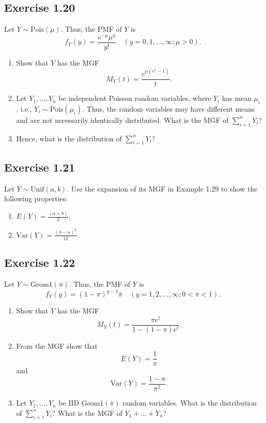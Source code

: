 \documentclass{book}
\begin{document}
\subsection{Exercise 1.20}
Let $Y \sim \text{Pois}(\mu)$. Thus, the PMF of $Y$ is
\[
f_Y(y) = \frac{e^{-\mu} \mu^y}{y!} \quad (y = 0, 1, \ldots, \infty; \mu > 0).
\]
\begin{enumerate}
    \item Show that $Y$ has the MGF
    \[
    M_Y(t) = \frac{e^{\mu(e^t - 1)}}{t}.
    \]
    \item Let $Y_1, \ldots, Y_n$ be independent Poisson random variables, where $Y_i$ has mean $\mu_i$, i.e., $Y_i \sim \text{Pois}(\mu_i)$. Thus, the random variables may have different means and are not necessarily identically distributed. What is the MGF of $\sum_{i=1}^n Y_i$? 
    \item Hence, what is the distribution of $\sum_{i=1}^n Y_i$?
\end{enumerate}

\subsection{Exercise 1.21}
Let $Y \sim \text{Unif}(a, b)$. Use the expansion of its MGF in Example 1.29 to show the following properties:
\begin{enumerate}
    \item $E(Y) = \frac{(a + b)}{2}$;
    \item $\text{Var}(Y) = \frac{(b - a)^2}{12}$.
\end{enumerate}

\subsection{Exercise 1.22}
Let $Y \sim \text{Geom1}(\pi)$. Thus, the PMF of $Y$ is
\[
f_Y(y) = (1 - \pi)^{y - 1} \pi \quad (y = 1, 2, \ldots, \infty; 0 < \pi < 1).
\]
\begin{enumerate}
    \item Show that $Y$ has the MGF
    \[
    M_Y(t) = \frac{\pi e^t}{1 - (1 - \pi)e^t}.
    \]
    \item From the MGF show that 
    \[
    E(Y) = \frac{1}{\pi}
    \]
    and 
    \[
    \text{Var}(Y) = \frac{1 - \pi}{\pi^2}.
    \]
    \item Let $Y_1, \ldots, Y_n$ be IID $\text{Geom1}(\pi)$ random variables. What is the distribution of $\sum_{i=1}^n Y_i$? What is the MGF of $Y_1 + \ldots + Y_n$?
\end{enumerate}
\end{document}

